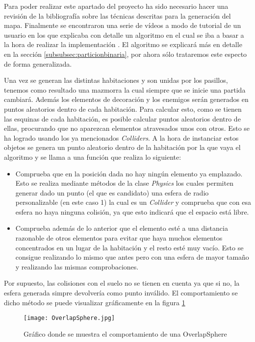 Para poder realizar este apartado del proyecto ha sido necesario hacer una revisión de la bibliografía sobre las técnicas descritas para la generación del mapa. Finalmente se encontraron una serie de vídeos a modo de tutorial de un usuario en los que explicaba con detalle un algoritmo en el cual se iba a basar a la hora de realizar la implementación \cite{videosGeneracionProce}. El algoritmo se explicará más en detalle en la sección \ref{subsubsec:particionbinaria}, por ahora sólo trataremos este especto de forma generalizada.

Una vez se generan las distintas habitaciones y son unidas por los pasillos, tenemos como resultado una mazmorra la cual siempre que se inicie una partida cambiará. Además los elementos de decoración y los enemigos serán generados en puntos aleatorios dentro de cada habitación. Para calcular esto, como se tienen las esquinas de cada habitación, es posible calcular puntos aleatorios dentro de ellas, procurando que no aparezcan elementos atravesados unos con otros. Esto se ha logrado usando los ya mencionados \textit{Colliders}. A la hora de instanciar estos objetos se genera un punto aleatorio dentro de la habitación por la que vaya el algoritmo y se llama a una función que realiza lo siguiente: 

\begin{itemize}    
    \item Comprueba que en la posición dada no hay ningún elemento ya emplazado. Esto se realiza mediante métodos de la clase \textit{Physics} los cuales permiten generar dado un punto (el que es candidato) una esfera de radio personalizable (en este caso 1) la cual es un \textit{Collider} y comprueba que con esa esfera no haya ninguna colisión, ya que esto indicará que el espacio está libre.
    \item Comprueba además de lo anterior que el elemento esté a una distancia razonable de otros elementos para evitar que haya muchos elementos concentrados en un lugar de la habitación y el resto esté muy vacío. Esto se consigue realizando lo mismo que antes pero con una esfera de mayor tamaño y realizando las mismas comprobaciones.
\end{itemize}

Por supuesto, las colisiones con el suelo no se tienen en cuenta ya que si no, la esfera generada simpre devolvería como punto inválido. El comportamiento se dicho método se puede visualizar gráficamente en la figura \ref{fig:OverlapSphere}

\begin{figure}
    \centering
    \texttt{[image: OverlapSphere.jpg]}
    \caption{Gráfico donde se muestra el comportamiento de una OverlapSphere}
    \label{fig:OverlapSphere}
\end{figure}

